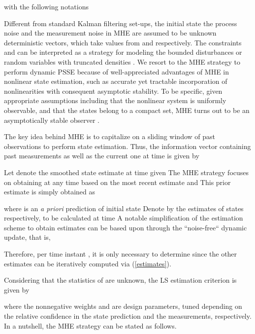 \documentclass[conference]{IEEEtran}
\begin{document}
with the following notations








Different from standard Kalman filtering set-ups, the initial state  the process noise  and the measurement noise  in MHE are assumed to be unknown deterministic vectors, which take values from  and  respectively. The constraints  and  can be interpreted as a strategy for modeling the bounded disturbances or random variables with truncated densities \cite{tac:rao2003}. We resort to the MHE strategy to perform dynamic PSSE because of well-appreciated advantages of MHE in nonlinear state estimation, such as accurate yet tractable incorporation of nonlinearities with consequent asymptotic stability. To be specific, given appropriate assumptions including that the nonlinear system is uniformly observable, and that the states belong to a compact set, MHE turns out to be an asymptotically stable observer  \cite[Prop. 3.4]{tac:rao2003}. \iffalse; see, e.g., Prop. 3.4 in \cite{tac:rao2003} for more details.\fi


The key idea behind MHE is to capitalize on a sliding window of past observations to perform state estimation. Thus, the information vector containing
 past measurements as well as the current one at time  is given by


Let  denote the smoothed state estimate at time  given  The
MHE strategy focuses on obtaining  at any time  based on the most recent
estimate  and  This prior estimate  is simply obtained as

where  is an \emph{a priori} prediction of initial state 
Denote by  the estimates of states  respectively, to be calculated at time  A notable simplification of the estimation scheme to obtain estimates  can be based upon  through the ``noise-free`` dynamic update, that is,

Therefore, per time instant , it is only necessary to determine  since the other  estimates can be iteratively computed via (\ref{estimates}).





Considering that the statistics of  are unknown, the LS estimation criterion is given by

where the nonnegative weights  and  are design parameters, tuned depending on the relative confidence in the state prediction  and the measurements, respectively. In a nutshell, the MHE strategy can be stated as follows.
\end{document}
